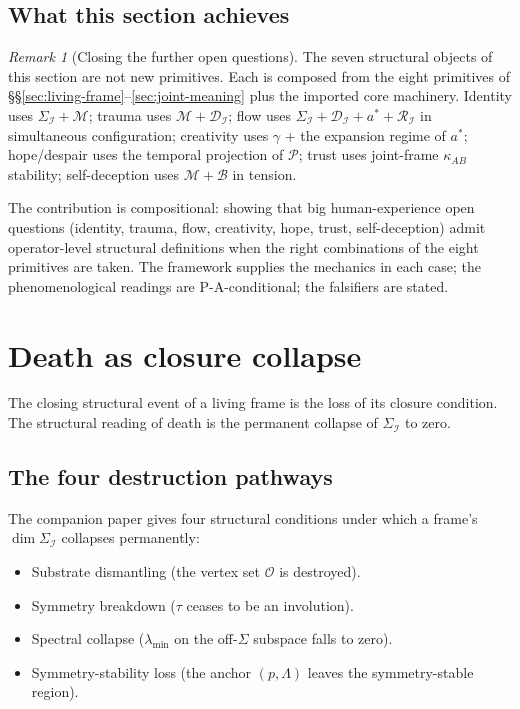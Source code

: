 \documentclass[11pt]{article}
\theoremstyle{plain}
\theoremstyle{definition}
\theoremstyle{remark}
\newtheorem{remark}[theorem]{Remark}
\newcommand{\Ical}{\mathcal{I}}
\newcommand{\Ocal}{\mathcal{O}}
\newcommand{\Mcal}{\mathcal{M}}
\newcommand{\Bcal}{\mathcal{B}}
\newcommand{\Rcal}{\mathcal{R}}
\newcommand{\Dcal}{\mathcal{D}}
\newcommand{\Pcal}{\mathcal{P}}
\begin{document}
\subsection{What this section achieves}

\begin{remark}[Closing the further open questions]\label{rem:further-objects-summary}
The seven structural objects of this section are not new primitives. Each is composed from the eight primitives of \S\S\ref{sec:living-frame}--\ref{sec:joint-meaning} plus the imported core machinery. Identity uses $\Sigma_\Ical + \Mcal$; trauma uses $\Mcal + \Dcal_\Ical$; flow uses $\Sigma_\Ical + \Dcal_\Ical + a^* + \Rcal_\Ical$ in simultaneous configuration; creativity uses $\gamma$ + the expansion regime of $a^*$; hope/despair uses the temporal projection of $\Pcal$; trust uses joint-frame $\kappa_{AB}$ stability; self-deception uses $\Mcal + \Bcal$ in tension.

The contribution is compositional: showing that big human-experience open questions (identity, trauma, flow, creativity, hope, trust, self-deception) admit operator-level structural definitions when the right combinations of the eight primitives are taken. The framework supplies the mechanics in each case; the phenomenological readings are P-A-conditional; the falsifiers are stated.
\end{remark}

\section{Death as closure collapse}\label{sec:death}

The closing structural event of a living frame is the loss of its closure condition. The structural reading of death is the permanent collapse of $\Sigma_\Ical$ to zero.

\subsection{The four destruction pathways}

The companion paper \citep{SmartCosmicClosure} gives four structural conditions under which a frame's $\dim \Sigma_\Ical$ collapses permanently:

\begin{itemize}[leftmargin=2em]
\item Substrate dismantling (the vertex set $\Ocal$ is destroyed).
\item Symmetry breakdown ($\tau$ ceases to be an involution).
\item Spectral collapse ($\lambda_{\min}$ on the off-$\Sigma$ subspace falls to zero).
\item Symmetry-stability loss (the anchor $(p, \Lambda)$ leaves the symmetry-stable region).
\end{itemize}
\end{document}
